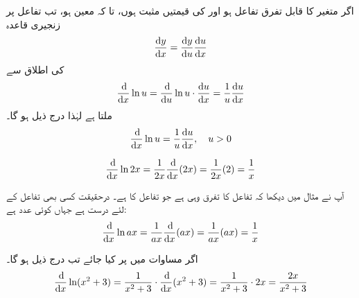 اگر  متغیر  کا قابل تفرق تفاعل ہو اور  کی قیمتیں مثبت ہوں، تا کہ  معین  ہو، تب تفاعل  پر زنجیری قاعدہ
\begin{align*}
\frac{\dif y}{\dif x}=\frac{\dif y}{\dif u}\frac{\dif u}{\dif x}
\end{align*}
 کی اطلاق سے 
\begin{align*}
\frac{\dif}{\dif x}\ln u=\frac{\dif}{\dif u}\ln u\cdot \frac{\dif u}{\dif x}=\frac{1}{u}\frac{\dif u}{\dif x}
\end{align*}
ملتا ہے لہٰذا درج ذیل ہو گا۔
\begin{align}\label{مساوات_ماورائی_لوگارتھمی_تفرق_الف}
\frac{\dif}{\dif x}\ln u=\frac{1}{u}\frac{\dif u}{\dif x},\quad u>0
\end{align}

\begin{align*}
\frac{\dif}{\dif x}\ln 2x=\frac{1}{2x}\frac{\dif}{\dif x}(2x)=\frac{1}{2x}(2)=\frac{1}{x}
\end{align*}

آپ نے مثال  میں دیکھا کہ تفاعل  کا تفرق وہی ہے جو تفاعل  کا ہے۔ درحقیقت کسی بھی تفاعل  کے لئے درست ہے جہاں  کوئی عدد ہے:
\begin{align}\label{مساوات_ماورائی_لوگارتھمی_تفرق_ب}
\frac{\dif}{\dif x}\ln ax=\frac{1}{ax}\frac{\dif}{\dif x}(ax)=\frac{1}{ax}(ax)=\frac{1}{x}
\end{align}

اگر مساوات  میں  پر کیا جائے تب درج ذیل ہو گا۔
\begin{align*}
\frac{\dif}{\dif x}\ln(x^2+3)=\frac{1}{x^2+3}\cdot\frac{\dif}{\dif x}(x^2+3)=\frac{1}{x^2+3}\cdot 2x=\frac{2x}{x^2+3}
\end{align*}

